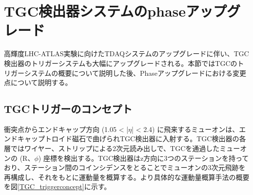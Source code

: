 \section{TGC検出器システムのphase\two アップグレード}
\label{sec_TGCtrigger}
高輝度LHC-ATLAS実験に向けたTDAQシステムのアップグレードに伴い、TGC検出器のトリガーシステムも大幅にアップグレードされる。本節ではTGCのトリガーシステムの概要について説明した後、Phase\two アップグレードにおける変更点について説明する。

    \subsection{TGCトリガーのコンセプト}
    \label{subsec_trigger_concept}
衝突点からエンドキャップ方向  (1.05 < |$\eta$| < 2.4) に飛来するミューオンは、エンドキャップトロイド磁石で曲げられTGC検出器に入射する。TGC検出器の各層ではワイヤー、ストリップによる2次元読み出しで、TGCを通過したミューオンの  (R、$\phi$) 座標を検出する。TGC検出器はz方向に3つのステーションを持っており、ステーション間のコインシデンスをとることでミューオンの3次元飛跡を再構成し、それをもとに運動量を概算する。より具体的な運動量概算手法の概要を図\ref{TGC_triggerconcept}に示す。

